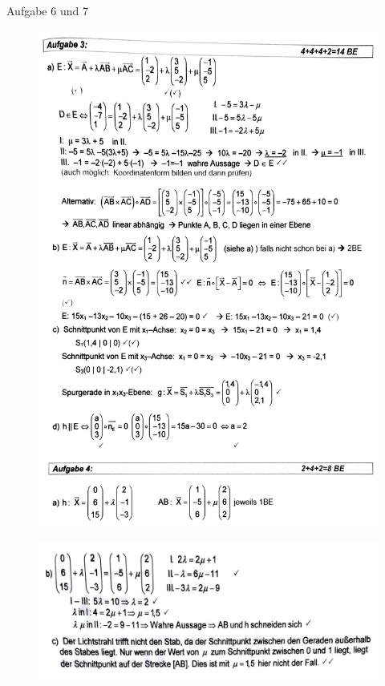 \documentclass[a4paper,12pt]{article}
\begin{document}
  Aufgabe 6 und 7
  \begin{figure}[H]
    \vspace{0cm}
    \centering
    \includegraphics[width=0.9\linewidth]{ml_240215_2.jpg}
  \end{figure}

  \begin{figure}[H]
    \vspace{0cm}
    \centering
    \includegraphics[width=0.9\linewidth]{ml_240215_3.jpg}
  \end{figure}
\end{document}
